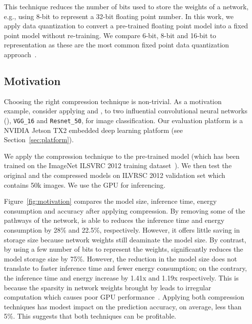  This technique reduces the number of bits used to store the weights of a network, e.g., using 8-bit to
represent a 32-bit floating point number. In this work, we apply data quantization to convert a pre-trained floating point model into a
fixed point model without re-training. We compare 6-bit, 8-bit and 16-bit to representation as these are the most common fixed point data
quantization approach~\cite{pacq}.



\subsection{Motivation}
Choosing the right compression technique is non-trivial. As a motivation example, consider applying \pruning and \dquantization, to two
influential convolutional neural networks (\CNN), \texttt{VGG\_16} 	and \texttt{Resnet\_50}, for image classification. Our evaluation
platform is a NVIDIA Jetson TX2 embedded deep learning platform (see Section~\ref{sec:platform}).

 We apply the compression technique to the pre-trained model (which has been trained on the ImageNet ILSVRC 2012
training dataset~\cite{imagenet2012}). We then test the original and the compressed models on ILVRSC 2012 validation set which contains 50k
images. We use the GPU for inferencing.

 Figure~\ref{fig:motivation} compares the model size, inference time, energy consumption and accuracy after
applying compression. By removing some of the pathways of the network, \pruning is able to reduces the inference time and energy
consumption by 28\% and 22.5\%, respectively. However, it offers little saving in storage size because network weights still deaminate the
model size. By contrast, by using a few number of bits to represent the weights, \quantization significantly reduces the model storage size
by 75\%. However, the reduction in the model size does not translate to faster inference time and fewer energy consumption; on the
contrary, the inference time and energy increase by 1.41x and 1.19x respectively.
This is because the sparsity in network weights brought by \quantization leads to irregular computation which causes poor GPU
performance~\cite{DBLP:journals/corr/abs-1802-10280}. Applying both compression techniques has modest impact on the prediction accuracy, on
average, less than 5\%. This suggests that both techniques can be profitable.

